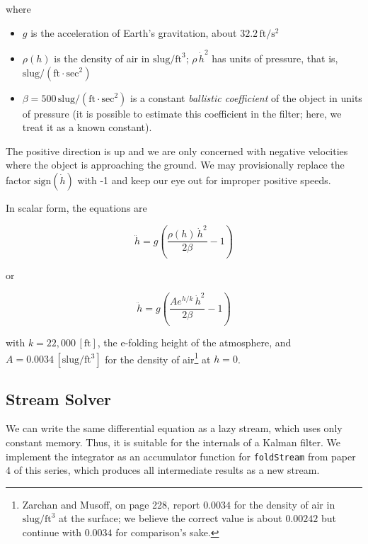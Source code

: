 \documentclass[10pt,oneside,x11names]{article}
\begin{document}
\noindent where 
\begin{itemize}
\item \(g\) is the acceleration of Earth's gravitation, about
\(32.2\,\textrm{ft}/{\textrm{s}}^2\)
\item \(\rho(h)\) is the density of air in \(\textrm{slug}/{\textrm{ft}}^3\); \(\rho\,{{\dot{h}}^2}\) has
units of pressure, that is, \(\textrm{slug}/(\textrm{ft}\cdot{\textrm{sec}^2})\)
\item \(\beta = 500\,\textrm{slug}/(\textrm{ft}\cdot{\textrm{sec}^2})\)
is a constant \emph{ballistic coefficient}  of the object in units of pressure (it
is possible to estimate this coefficient in the filter; here, we
treat it as a known constant).
\end{itemize}

The positive direction is up and we are only concerned with negative velocities
where the object is approaching the ground. We may provisionally replace the
factor \(\textrm{sign}({\dot{h}})\) with -1 and keep our eye out for improper
positive speeds. 

In scalar form, the equations are 

\begin{equation*}
\ddot { h }
=
g\left(\frac{\rho(h)\,{{\dot{h}}^2}}{2\beta}-1\right)
\end{equation*}

\noindent or 

\begin{equation}
\label{eqn:scalar-equations-of-motion}
\ddot { h }
=
g\left(\frac{A e^{h/k}\,{{\dot{h}}^2}}{2\beta}-1\right)
\end{equation}

\noindent 
with
\(k=22,000\,\left[\textrm{ft}\right]\), the e-folding height of the atmosphere,
and \(A=0.0034\,[\textrm{slug}/{{\textrm{ft}}^3}]\) for the density of
air\footnote{Zarchan and Musoff, on page 228, report \(0.0034\) for the density of air in
\(\textrm{slug}/\textrm{ft}^3\) at the surface; we believe the correct
value is about \(0.00242\) but continue with \(0.0034\) for comparison's sake.} at \(h=0\).

\subsection{Stream Solver}
\label{sec:orgheadline6}

We can write the same differential equation as a lazy stream, which uses only
constant memory. Thus, it is suitable for the internals of a Kalman filter. We
implement the integrator as an accumulator function for \texttt{foldStream} from paper
4 of this series,\footnotemark[3]{} which
produces all intermediate results as a new stream.
\end{document}
